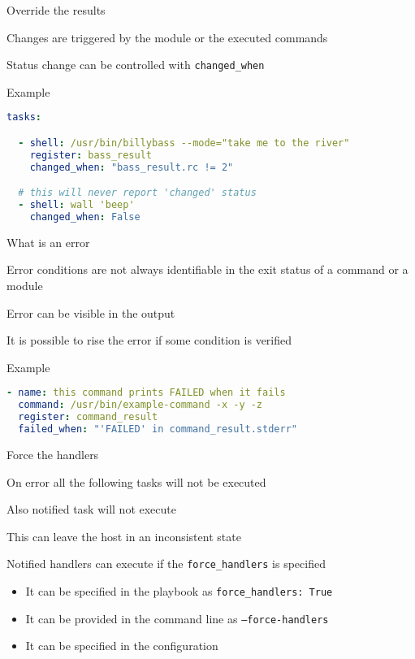 \documentclass[12pt, xcolor={dvipsnames}]{beamer}
\newenvironment{wideitemize}{\itemize\addtolength{\itemsep}{12pt}}{\enditemize}
\begin{document}
\begin{frame}[t, fragile]{Override the results}
  \begin{wideitemize}
    \item Changes are triggered by the module or the executed commands
    \item Status change can be controlled with \alert{\texttt{changed\_when}}
  \end{wideitemize}
  \begin{block}{Example}
    \begin{lstlisting}[language=yaml, basicstyle=\scriptsize]
tasks:

  - shell: /usr/bin/billybass --mode="take me to the river"
    register: bass_result
    changed_when: "bass_result.rc != 2"

  # this will never report 'changed' status
  - shell: wall 'beep'
    changed_when: False
  \end{lstlisting}
  \end{block}
\end{frame}

\begin{frame}[t, fragile]{What is an error}
  \begin{wideitemize}
    \item Error conditions are not always identifiable in the exit
    status of a command or a module
    \item Error can be visible in the output
    \item It is possible to rise the error if some condition is verified
  \end{wideitemize}
  \begin{block}{Example}
    \begin{lstlisting}[language=yaml, basicstyle=\scriptsize]
- name: this command prints FAILED when it fails
  command: /usr/bin/example-command -x -y -z
  register: command_result
  failed_when: "'FAILED' in command_result.stderr"
    \end{lstlisting}
  \end{block}
\end{frame}

\begin{frame}[t]{Force the handlers}
  \begin{wideitemize}
    \item On error all the following tasks will not be executed
    \item Also notified task will not execute
    \item This can leave the host in an inconsistent state
    \item Notified handlers can execute if the \alert{\texttt{force\_handlers}} is specified
    \begin{itemize}
      \item It can be specified in the playbook as \texttt{force\_handlers: True}
      \item It can be provided in the command line as \texttt{--force-handlers}
      \item It can be specified in the configuration
    \end{itemize}
  \end{wideitemize}
\end{frame}
\end{document}
